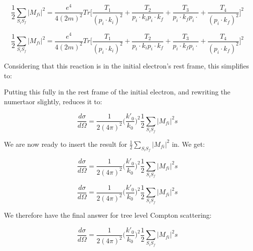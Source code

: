 \documentclass[a4]{article}
\begin{document}
    \begin{equation}
        \frac{1}{2} \sum_{S_i S_f} |M_{fi}|^2 = \frac{e^4}{4 (2m)^2} Tr \Bigg[ \frac{T_1}{(p_i \cdot k_i)^2} + \frac{T_2}{p_i \cdot k_i p_i \cdot k_f} + \frac{T_3}{p_i \cdot k_f p_i \cdot} + \frac{T_4}{(p_i \cdot k_f)^2} \Bigg]^2
    \end{equation}

    \begin{equation}
        \frac{1}{2} \sum_{S_i S_f} |M_{fi}|^2 = \frac{e^4}{4 (2m)^2} Tr \Bigg[ \frac{T_1}{(p_i \cdot k_i)^2} + \frac{T_2}{p_i \cdot k_i p_i \cdot k_f} + \frac{T_3}{p_i \cdot k_f p_i \cdot} + \frac{T_4}{(p_i \cdot k_f)^2} \Bigg]^2
    \end{equation}

    Considering that this reaction is in the initial electron's rest frame, this simplifies to:

    Putting this fully in the rest frame of the initial electron, and rewriting the numertaor slightly, reduces it to:

    \begin{equation}
        \frac{d \sigma}{d \Omega} = \frac{1}{2 (4 \pi)^2} \bigg( \frac{k'_0}{k_0} \bigg)^2 \frac{1}{2} \sum_{S_i S_f} |M_{fi}|^2s
    \end{equation}

    We are now ready to insert the result for $\frac{1}{2} \sum_{S_i S_f} |M_{fi}|^2$ in. We get:

    \begin{equation}
        \frac{d \sigma}{d \Omega} = \frac{1}{2 (4 \pi)^2} \bigg( \frac{k'_0}{k_0} \bigg)^2 \frac{1}{2} \sum_{S_i S_f} |M_{fi}|^2s
    \end{equation}

    \begin{equation}
        \frac{d \sigma}{d \Omega} = \frac{1}{2 (4 \pi)^2} \bigg( \frac{k'_0}{k_0} \bigg)^2 \frac{1}{2} \sum_{S_i S_f} |M_{fi}|^2s
    \end{equation}

    We therefore have the final answer for tree level Compton scattering:

    \begin{framed}
        \begin{equation}
            \frac{d \sigma}{d \Omega} = \frac{1}{2 (4 \pi)^2} \bigg( \frac{k'_0}{k_0} \bigg)^2 \frac{1}{2} \sum_{S_i S_f} |M_{fi}|^2s
        \end{equation}
    \end{framed}
\end{document}
